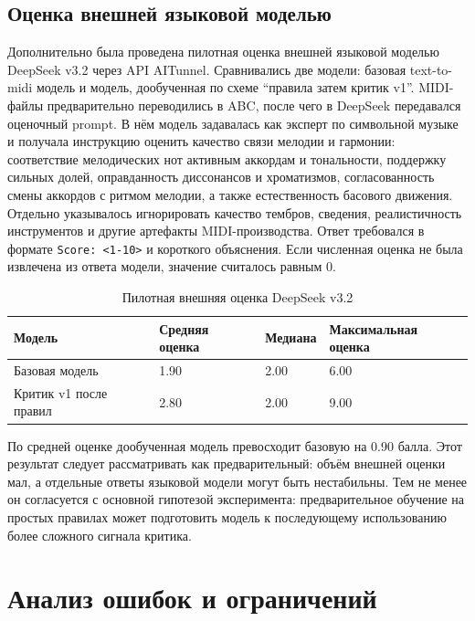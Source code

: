 \documentclass[a4paper,12pt]{extarticle}
\begin{document}
\subsection{Оценка внешней языковой моделью}

Дополнительно была проведена пилотная оценка внешней языковой моделью
DeepSeek v3.2 через API AITunnel. Сравнивались две модели: базовая
text-to-midi модель и модель, дообученная по схеме ``правила затем критик
v1''. MIDI-файлы предварительно переводились в ABC, после чего в DeepSeek
передавался оценочный prompt. В нём модель задавалась как эксперт по
символьной музыке и получала инструкцию оценить качество связи мелодии и
гармонии: соответствие мелодических нот активным аккордам и тональности,
поддержку сильных долей, оправданность диссонансов и хроматизмов,
согласованность смены аккордов с ритмом мелодии, а также естественность
басового движения. Отдельно указывалось игнорировать качество тембров,
сведения, реалистичность инструментов и другие артефакты MIDI-производства.
Ответ требовался в формате \texttt{Score: <1-10>} и короткого объяснения.
Если численная оценка не была извлечена из ответа модели, значение считалось
равным 0.

\begin{table}[h]
\centering
\caption{Пилотная внешняя оценка DeepSeek v3.2}
\label{tab:external-score-results}
\begin{tabular}{|p{}|p{}|p{}|p{}|}
\hline
\textbf{Модель} & \textbf{Средняя оценка} & \textbf{Медиана} & \textbf{Максимальная оценка} \\
\hline
Базовая модель & 1.90 & 2.00 & 6.00 \\
\hline
Критик v1 после правил & 2.80 & 2.00 & 9.00 \\
\hline
\end{tabular}
\end{table}

По средней оценке дообученная модель превосходит базовую на 0.90 балла. Этот
результат следует рассматривать как предварительный: объём внешней оценки
мал, а отдельные ответы языковой модели могут быть нестабильны. Тем не менее
он согласуется с основной гипотезой эксперимента: предварительное обучение на
простых правилах может подготовить модель к последующему использованию более
сложного сигнала критика.

\section{Анализ ошибок и ограничений}
\end{document}

